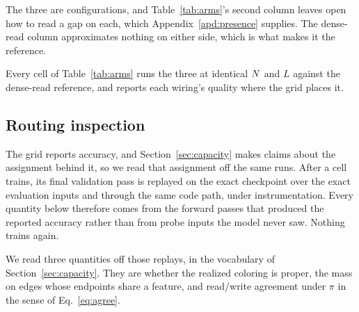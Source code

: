The three are configurations, and Table~\ref{tab:arms}'s second column leaves open how to read a gap on each, which Appendix~\ref{apd:presence} supplies. The dense-read column approximates nothing on either side, which is what makes it the reference.

Every cell of Table~\ref{tab:arms} runs the three at identical $N$ and $L$ against the dense-read reference, and reports each wiring's quality where the grid places it.

\subsection{Routing inspection}
\label{sec:inspection}

The grid reports accuracy, and Section~\ref{sec:capacity} makes claims about the assignment behind it, so we read that assignment off the same runs. After a cell trains, its final validation pass is replayed on the exact checkpoint over the exact evaluation inputs and through the same code path, under instrumentation. Every quantity below therefore comes from the forward passes that produced the reported accuracy rather than from probe inputs the model never saw. Nothing trains again.

We read three quantities off those replays, in the vocabulary of Section~\ref{sec:capacity}. They are whether the realized coloring is proper, the mass on edges whose endpoints share a feature, and read/write agreement under $\pi$ in the sense of Eq.~\eqref{eq:agree}.



